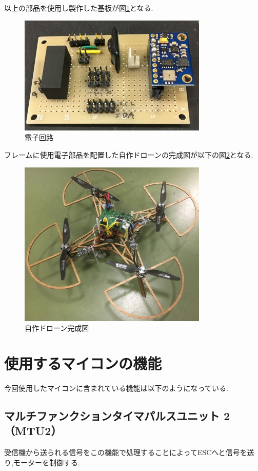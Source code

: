 \documentclass[12pt,oneside]{paper}
\begin{document}
以上の部品を使用し製作した基板が図\ref{fig:kairo}となる.

\begin{figure}[H]
\begin{center}
\includegraphics[width=90mm]{ga/kairo1.jpeg}
\end{center}
\caption{電子回路}
\label{fig:kairo}
\end{figure}

フレームに使用電子部品を配置した自作ドローンの完成図が以下の図\ref{fig:erc}となる.

\begin{figure}[H]
\begin{center}
\includegraphics[width=90mm]{ga/erc.jpg}
\end{center}
\caption{自作ドローン完成図}
\label{fig:erc}
\end{figure}

\section{使用するマイコンの機能}今回使用したマイコンに含まれている機能は以下のようになっている.

\subsection{マルチファンクションタイマパルスユニット 2（MTU2）}受信機から送られる信号をこの機能で処理することによってESCへと信号を送り,モーターを制御する.
\end{document}
